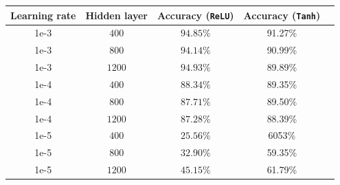 \documentclass[12pt, fullpage,letterpaper]{article}
\begin{document}
\begin{enumerate}
\begin{enumerate}
{\begin{center}
\begin{tabular}{ |c||c|c|c|c|}
 \hline
Learning rate & Hidden layer &  Accuracy (\texttt{ReLU}) & Accuracy (\texttt{Tanh})\\
 \hline
 1e-3   & $400$     & $94.85\%$ &   91.27\%\\ 
 \hline
 1e-3   & $800$     & $94.14\%$  &  90.99\%\\
 \hline
 1e-3   & $1200$   & $94.93\%$  &  89.89\%\\
  \hline
 \hline
 1e-4   & $400$      & $88.34\%$&  89.35\%\\  
 \hline
 1e-4   & $800$      & $87.71\%$ &  89.50\%\\
\hline
 1e-4   & $1200$    & $87.28\%$ &  88.39\%\\ 
 \hline
 \hline
 1e-5   & $400$    & $25.56\%$ &  6053\%\\  
 \hline
 1e-5   & $800$    & $32.90\%$ &  59.35\%\\
\hline
 1e-5   & $1200$    & $45.15\%$ &  61.79\%\\
 \hline
\end{tabular}
\end{center}
		
		

}
\end{enumerate}
\end{enumerate}
\end{document}
